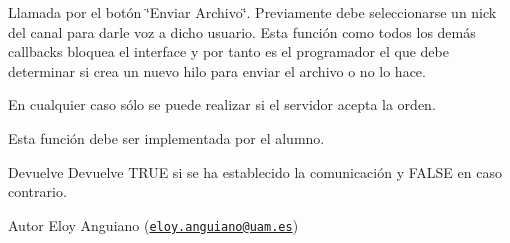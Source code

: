 Llamada por el botón \char`\"{}\-Enviar Archivo\char`\"{}. Previamente debe seleccionarse un nick del canal para darle voz a dicho usuario. Esta función como todos los demás callbacks bloquea el interface y por tanto es el programador el que debe determinar si crea un nuevo hilo para enviar el archivo o no lo hace.

En cualquier caso sólo se puede realizar si el servidor acepta la orden.

Esta función debe ser implementada por el alumno.

\begin{DoxyReturn}{Devuelve}
Devuelve T\-R\-U\-E si se ha establecido la comunicación y F\-A\-L\-S\-E en caso contrario.
\end{DoxyReturn}
\begin{DoxyAuthor}{Autor}
Eloy Anguiano (\href{mailto:eloy.anguiano@uam.es}{\tt eloy.\-anguiano@uam.\-es})
\end{DoxyAuthor}


 
